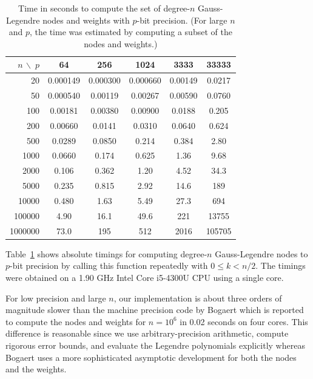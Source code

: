 \documentclass{siamart0216}
\begin{document}
\begin{table}[h!]
\caption{Time in seconds to compute the set of degree-$n$ Gauss-Legendre nodes and weights with $p$-bit precision.
(For large $n$ and $p$, the time was estimated by computing a subset of the nodes and weights.)}
\label{tab:timings}
\begin{center}
\begin{tabular}{ r | c c c c c }
$n\, \backslash \; p$ & 64 & 256 & 1024 & 3333 & 33333 \\
\hline\rule{0pt}{3ex}
20  & 0.000149  &  0.000300  &  0.000660  &  0.00149  &  0.0217 \\ 
50  & 0.000540  &  0.00119  &  0.00267  &  0.00590  &  0.0760  \\ 
100  & 0.00181  &  0.00380  &  0.00900  &  0.0188  &  0.205  \\ 
200  & 0.00660  &  0.0141  &  0.0310  &  0.0640  &  0.624  \\ 
500  & 0.0289  &  0.0850  &  0.214  &  0.384  &  2.80  \\ 
1000  & 0.0660  &  0.174  &  0.625  &  1.36  &  9.68  \\ 
2000  & 0.106  &  0.362  &  1.20  &  4.52  &  34.3  \\ 
5000  & 0.235  &  0.815  &  2.92  &  14.6  &  189  \\ 
10000  & 0.480  &  1.63  &  5.49  &  27.3  &  694  \\ 
100000  & 4.90  &  16.1  &  49.6  &  221  &  13755  \\ 
1000000  & 73.0  &  195  &  512  &  2016  &  105705
\end{tabular}
\end{center}
\end{table}

Table~\ref{tab:timings} shows absolute timings for computing
degree-$n$ Gauss-Legendre nodes to $p$-bit precision
by calling this function repeatedly with $0 \le k < n / 2$.
The timings were obtained on a 1.90 GHz Intel Core i5-4300U CPU
using a single core.

For low precision and large $n$, our implementation
is about three orders of magnitude slower than the machine precision
code by Bogaert \cite{bogaert2014iteration}
which is reported to compute the nodes and weights for $n = 10^6$
in 0.02 seconds on four cores.
This difference is reasonable since we use arbitrary-precision arithmetic,
compute rigorous error bounds, and evaluate the Legendre polynomials
explicitly whereas Bogaert uses a more sophisticated
asymptotic development for both the nodes and the weights.
\end{document}
